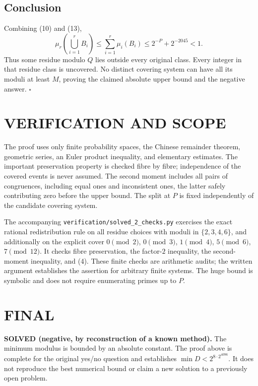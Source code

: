 \subsection{Conclusion}
Combining (10) and (13),
\[
 \mu_r\left(\bigcup_{i=1}^r B_i\right)
 \le\sum_{i=1}^r\mu_i(B_i)
 \le2^{-P}+2^{-2045}<1.
\]
Thus some residue modulo $Q$ lies outside every original class. Every integer in that residue class is uncovered. No distinct covering system can have all its moduli at least $M$, proving the claimed absolute upper bound and the negative answer. \hfill$\square$

\section{VERIFICATION AND SCOPE}
The proof uses only finite probability spaces, the Chinese remainder theorem, geometric series, an Euler product inequality, and elementary estimates. The important preservation property is checked fibre by fibre; independence of the covered events is never assumed. The second moment includes all pairs of congruences, including equal ones and inconsistent ones, the latter safely contributing zero before the upper bound. The split at $P$ is fixed independently of the candidate covering system.

The accompanying \texttt{verification/solved\_2\_checks.py} exercises the exact rational redistribution rule on all residue choices with moduli in $\{2,3,4,6\}$, and additionally on the explicit cover $0\pmod2$, $0\pmod3$, $1\pmod4$, $5\pmod6$, $7\pmod{12}$. It checks fibre preservation, the factor-$2$ inequality, the second-moment inequality, and (4). These finite checks are arithmetic audits; the written argument establishes the assertion for arbitrary finite systems. The huge bound is symbolic and does not require enumerating primes up to $P$.

\section{FINAL}
\textbf{SOLVED (negative, by reconstruction of a known method).} The minimum modulus is bounded by an absolute constant. The proof above is complete for the original yes/no question and establishes $\min D<2^{8\cdot2^{4096}}$. It does not reproduce the best numerical bound or claim a new solution to a previously open problem.

